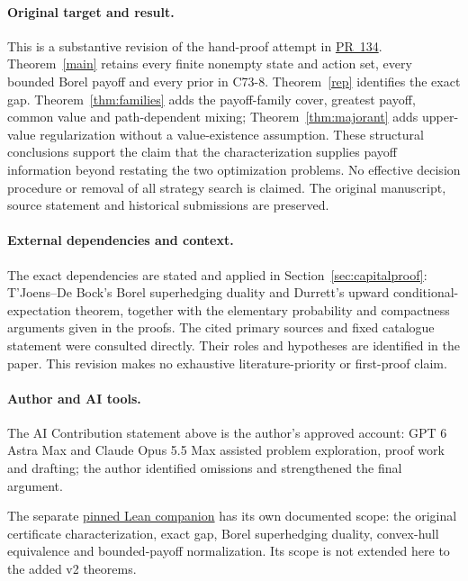 \documentclass[11pt,a4paper]{article}
\theoremstyle{definition}
\theoremstyle{remark}
\begin{document}
\paragraph{Original target and result.}
This is a substantive revision of the hand-proof attempt in
\href{https://github.com/mehmetmars7/Erdosproblems-llm-hunter/pull/134}{PR~134}.
Theorem~\ref{main} retains every finite nonempty state and action set,
every bounded Borel payoff and every prior in C73-8. Theorem~\ref{rep}
identifies the exact gap. Theorem~\ref{thm:families} adds the payoff-family
cover, greatest payoff, common value and path-dependent mixing;
Theorem~\ref{thm:majorant} adds upper-value regularization without a
value-existence assumption. These structural conclusions support the
claim that the characterization supplies payoff information beyond
restating the two optimization problems. No effective decision procedure
or removal of all strategy search is claimed. The original manuscript,
source statement and historical submissions are preserved.

\paragraph{External dependencies and context.}
The exact dependencies are stated and applied in Section~\ref{sec:capitalproof}:
T'Joens--De Bock's Borel superhedging duality and Durrett's upward
conditional-expectation theorem, together with the elementary probability
and compactness arguments given in the proofs. The cited primary sources
and fixed catalogue statement were consulted directly. Their roles and
hypotheses are identified in the paper. This revision makes no exhaustive
literature-priority or first-proof claim.

\paragraph{Author and AI tools.}
The AI Contribution statement above is the author's approved account:
GPT 6 Astra Max and Claude Opus 5.5 Max assisted problem exploration,
proof work and drafting; the author identified omissions and
strengthened the final argument.

The separate
\href{https://github.com/jbaelaw/borel-value-certificates-lean-20261011/blob/adfa513ba33427af32e3bca4a01f0a86a1086db4/README.md}{pinned Lean companion}
has its own documented scope: the original certificate characterization,
exact gap, Borel superhedging duality, convex-hull equivalence and
bounded-payoff normalization. Its scope is not extended here to the
added v2 theorems.
\end{document}
